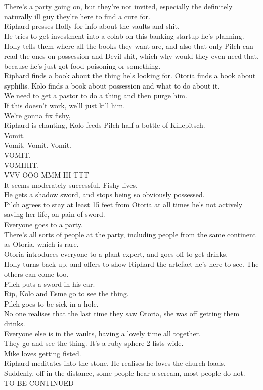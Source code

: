 There’s a party going on, but they’re not invited, especially the definitely naturally ill guy they’re here to find a cure for.\\
Riphard presses Holly for info about the vaults and shit.\\
He tries to get investment into a colab on this banking startup he’s planning.\\
Holly tells them where all the books they want are, and also that only Pilch can read the ones on possession and Devil shit, which why would they even need that, because he’s just got food poisoning or something.\\
Riphard finds a book about the thing he’s looking for. Otoria finds a book about syphilis. Kolo finds a book about possession and what to do about it.\\
We need to get a pastor to do a thing and then purge him.\\
If this doesn’t work, we’ll just kill him.\\
We’re gonna fix fishy,\\
Riphard is chanting, Kolo feeds Pilch half a bottle of Killepitsch.\\
Vomit.\\
Vomit. Vomit. Vomit.\\
VOMIT.\\
VOMIIIIT.\\
VVV OOO MMM III TTT\\
It seems moderately successful. Fishy lives.\\
He gets a shadow sword, and stops being so obviously possessed.\\
Pilch agrees to stay at least 15 feet from Otoria at all times he's not actively saving her life, on pain of sword.\\
Everyone goes to a party.\\
There’s all sorts of people at the party, including people from the same continent as Otoria, which is rare.\\
Otoria introduces everyone to a plant expert, and goes off to get drinks.\\
Holly turns back up, and offers to show Riphard the artefact he’s here to see. The others can come too.\\
Pilch puts a sword in his ear.\\
Rip, Kolo and Esme go to see the thing.\\
Pilch goes to be sick in a hole.\\
No one realises that the last time they saw Otoria, she was off getting them drinks.\\
Everyone else is in the vaults, having a lovely time all together.\\
They go and see the thing. It’s a ruby sphere 2 fists wide.\\
Mike loves getting fisted.\\
Riphard meditates into the stone. He realises he loves the church loads.\\
Suddenly, off in the distance, some people hear a scream, most people do not.\\
TO BE CONTINUED